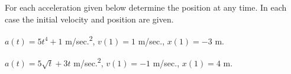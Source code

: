 \begin{problem}
\item For each acceleration given below determine the position at any
  time. In each case the initial velocity and position are given.
  \begin{subproblem}
  \item $a(t)=5t^4+1$ m/sec.\textsuperscript{2}, $v(1)=1$ m/sec.,
    $x(1)=-3$ m.
    \vfill
  \item $a(t)=5\sqrt{t}+3t$ m/sec.\textsuperscript{2}, $v(1)=-1$ m/sec.,
    $x(1)=4$ m.
    \vfill
  \end{subproblem}
\end{problem}


